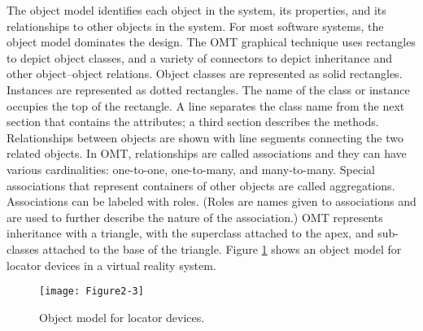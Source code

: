 The object model identifies each object in the system, its properties, and its relationships to other objects in the system. For most software systems, the object model dominates the design. The OMT graphical technique uses rectangles to depict object classes, and a variety of connectors to depict inheritance and other object--object relations. Object classes are represented as solid rectangles. Instances are represented as dotted rectangles. The name of the class or instance occupies the top of the rectangle. A line separates the class name from the next section that contains the attributes; a third section describes the methods. Relationships between objects are shown with line segments connecting the two related objects. In OMT, relationships are called associations and they can have various cardinalities: one-to-one, one-to-many, and many-to-many. Special associations that represent containers of other objects are called aggregations. Associations can be labeled with roles. (Roles are names given to associations and are used to further describe the nature of the association.) OMT represents inheritance with a triangle, with the superclass attached to the apex, and sub-classes attached to the base of the triangle. Figure \ref{fig:Figure2-3} shows an object model for locator devices in a virtual reality system.

\begin{figure}[!htb]
	\centering
	\texttt{[image: Figure2-3]}
	\caption{Object model for locator devices.}
	\label{fig:Figure2-3}
\end{figure}

